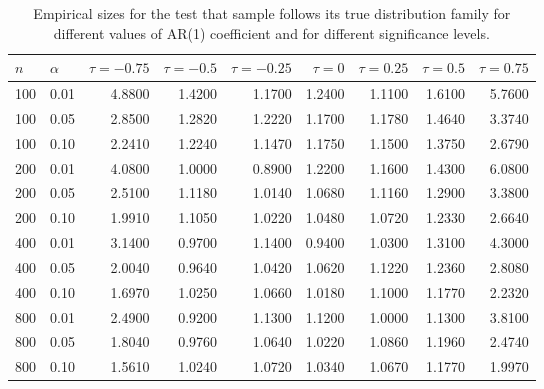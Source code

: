 \begin{table}[ht]
\centering
\caption{Empirical sizes for the test that sample follows its true
                    distribution family for
                   different values of AR(1) coefficient and for different 
                   significance levels.} 
\label{table:rr_gamma}
\begin{tabular}{llrrrrrrr}
  \hline
$n$ & $\alpha$ & $\tau = -0.75$ & $\tau = -0.5$ & $\tau = -0.25$ & $\tau = 0$ & $\tau = 0.25$ & $\tau = 0.5$ & $\tau = 0.75$ \\ 
  \hline
100 & 0.01 & 4.8800 & 1.4200 & 1.1700 & 1.2400 & 1.1100 & 1.6100 & 5.7600 \\ 
  100 & 0.05 & 2.8500 & 1.2820 & 1.2220 & 1.1700 & 1.1780 & 1.4640 & 3.3740 \\ 
  100 & 0.10 & 2.2410 & 1.2240 & 1.1470 & 1.1750 & 1.1500 & 1.3750 & 2.6790 \\ 
  200 & 0.01 & 4.0800 & 1.0000 & 0.8900 & 1.2200 & 1.1600 & 1.4300 & 6.0800 \\ 
  200 & 0.05 & 2.5100 & 1.1180 & 1.0140 & 1.0680 & 1.1160 & 1.2900 & 3.3800 \\ 
  200 & 0.10 & 1.9910 & 1.1050 & 1.0220 & 1.0480 & 1.0720 & 1.2330 & 2.6640 \\ 
  400 & 0.01 & 3.1400 & 0.9700 & 1.1400 & 0.9400 & 1.0300 & 1.3100 & 4.3000 \\ 
  400 & 0.05 & 2.0040 & 0.9640 & 1.0420 & 1.0620 & 1.1220 & 1.2360 & 2.8080 \\ 
  400 & 0.10 & 1.6970 & 1.0250 & 1.0660 & 1.0180 & 1.1000 & 1.1770 & 2.2320 \\ 
  800 & 0.01 & 2.4900 & 0.9200 & 1.1300 & 1.1200 & 1.0000 & 1.1300 & 3.8100 \\ 
  800 & 0.05 & 1.8040 & 0.9760 & 1.0640 & 1.0220 & 1.0860 & 1.1960 & 2.4740 \\ 
  800 & 0.10 & 1.5610 & 1.0240 & 1.0720 & 1.0340 & 1.0670 & 1.1770 & 1.9970 \\ 
   \hline
\end{tabular}
\end{table}

